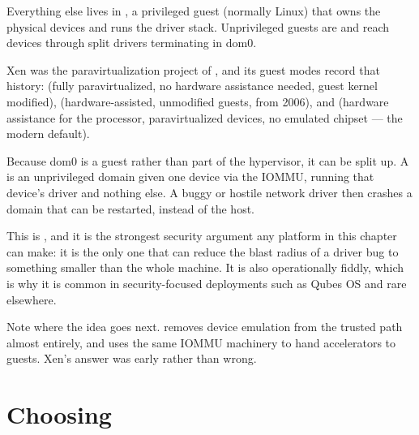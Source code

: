 Everything else lives in , a privileged guest (normally Linux) that
owns the physical devices and runs the driver stack. Unprivileged guests are
 and reach devices through split drivers terminating in dom0.

Xen was the paravirtualization project of , and its guest modes
record that history:  (fully paravirtualized, no hardware assistance
needed, guest kernel modified),  (hardware-assisted, unmodified
guests, from 2006), and  (hardware assistance for the processor,
paravirtualized devices, no emulated chipset --- the modern default).

\begin{conceptbox}
Because dom0 is a guest rather than part of the hypervisor, it can be split
up. A  is an unprivileged domain given one device via the
IOMMU, running that device's driver and nothing else. A buggy or hostile
network driver then crashes a domain that can be restarted, instead of the
host.

\smallskip
This is , and it is the strongest security argument any
platform in this chapter can make: it is the only one that can reduce the
blast radius of a driver bug to something smaller than the whole machine. It
is also operationally fiddly, which is why it is common in security-focused
deployments such as Qubes OS and rare elsewhere.

\smallskip
Note where the idea goes next.  removes device emulation
from the trusted path almost entirely, and  uses the same IOMMU
machinery to hand accelerators to guests. Xen's answer was early rather than
wrong.
\end{conceptbox}

\section{Choosing}

